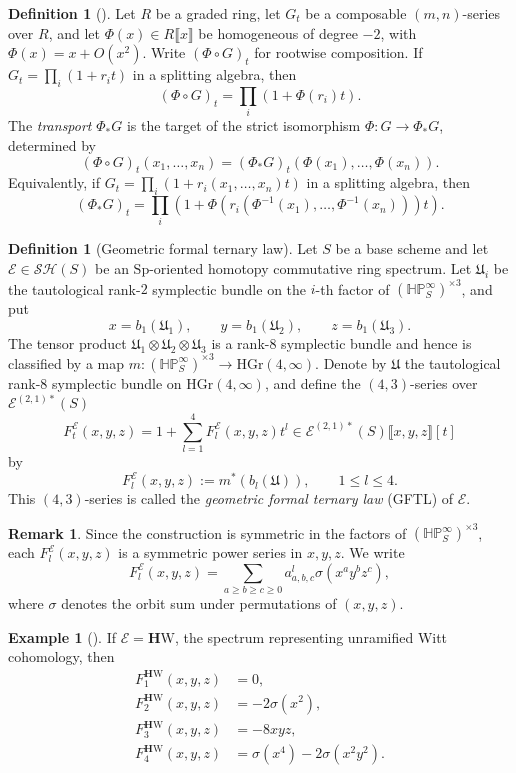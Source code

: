 \documentclass[a4paper]{amsart}
\theoremstyle{plain}
\theoremstyle{definition}
\newtheorem{definition}[subsubsection]{Definition}
\newtheorem{example}[subsubsection]{Example}
\newtheorem{remark}[subsubsection]{Remark}
\newcommand{\Sp}{\mathrm{Sp}}
\newcommand{\E}{\mathcal{E}}
\newcommand{\HP}{\mathbb{HP}}
\newcommand{\HGr}{\mathrm{HGr}}
\newcommand{\HW}{\mathbf{H}\mathrm{W}}
\newcommand{\SH}{\mathcal{SH}}
\renewcommand{\le}{\leqslant}
\renewcommand{\ge}{\geqslant}
\begin{document}
\begin{definition}[{\cite[Definitions~2.1.13 and 2.1.15]{coulette2024formal}}]
	\label{def:transport-of-series}
	Let $R$ be a graded ring, let $G_t$ be a composable $(m,n)$-series over $R$, and let $\Phi(x)\in R\llbracket x\rrbracket$ be homogeneous of degree $-2$, with $\Phi(x)=x+O(x^2)$. Write $(\Phi\circ G)_t$ for rootwise composition. If $G_t=\prod_i(1+r_i t)$ in a splitting algebra, then
	\[
		(\Phi\circ G)_t=\prod_i(1+\Phi(r_i)t).
	\]
	The \emph{transport} $\Phi_*G$ is the target of the strict isomorphism $\Phi:G\to\Phi_*G$, determined by
	\[
		(\Phi\circ G)_t(x_1,\ldots,x_n) = (\Phi_*G)_t(\Phi(x_1),\ldots,\Phi(x_n)).
	\]
	Equivalently, if $G_t=\prod_i(1+r_i(x_1,\ldots,x_n)t)$ in a splitting algebra, then
	\[
		(\Phi_*G)_t = \prod_i \left( 1+ \Phi\!\left( r_i(\Phi^{-1}(x_1),\ldots,\Phi^{-1}(x_n)) \right)t \right).
	\]
\end{definition}

\begin{definition}[Geometric formal ternary law]
	Let $S$ be a base scheme and let $\E \in \SH(S)$ be an $\Sp$-oriented homotopy commutative ring spectrum. Let $\mathfrak U_i$ be the tautological rank-$2$ symplectic bundle on the $i$-th factor of $(\HP^\infty_S)^{\times 3}$, and put
	\[
		x=b_1(\mathfrak U_1),\qquad y=b_1(\mathfrak U_2),\qquad z=b_1(\mathfrak U_3).
	\]
	The tensor product $\mathfrak U_1\otimes \mathfrak U_2\otimes \mathfrak U_3$ is a rank-$8$ symplectic bundle and hence is classified by a map $m:(\HP^\infty_S)^{\times 3}\to \HGr(4,\infty)$. Denote by $\mathfrak U$ the tautological rank-$8$ symplectic bundle on $\HGr(4,\infty)$, and define the $(4,3)$-series over $\E^{(2,1)*}(S)$
	\[
		F_t^\E(x,y,z)=1+\sum_{l=1}^4 F_l^\E(x,y,z)t^l
		\in \E^{(2,1)*}(S)\llbracket x,y,z\rrbracket[t]
	\]
	by
	\[
		F_l^\E(x,y,z):=m^*\left(b_l(\mathfrak U)\right),\qquad 1\le l\le 4.
	\]
	This $(4,3)$-series is called the \emph{geometric formal ternary law} (GFTL) of $\E$.
\end{definition}

\begin{remark}
	Since the construction is symmetric in the factors of $(\HP^\infty_S)^{\times 3}$, each $F_l^\E(x,y,z)$ is a symmetric power series in $x,y,z$. We write
	\[
		F_l^\E(x,y,z)=\sum_{a \ge b \ge c\ge 0} a^l_{a,b,c} \sigma(x^a y^b z^c),
	\]
	where $\sigma$ denotes the orbit sum under permutations of $(x,y,z)$.
\end{remark}

\begin{example}[{\cite[(3.2.4c)]{deglise2023the}}] \label{ex:gftl-over-hw}
	If $\E = \HW$, the spectrum representing unramified Witt cohomology, then
	\[
		\begin{aligned}
			F_{1}^{\HW}(x,y,z) & = 0,                              \\
			F_{2}^{\HW}(x,y,z) & = -2\sigma(x^2),                  \\
			F_{3}^{\HW}(x,y,z) & = -8xyz,                          \\
			F_{4}^{\HW}(x,y,z) & = \sigma(x^4) - 2\sigma(x^2 y^2).
		\end{aligned}
	\]
\end{example}
\end{document}
